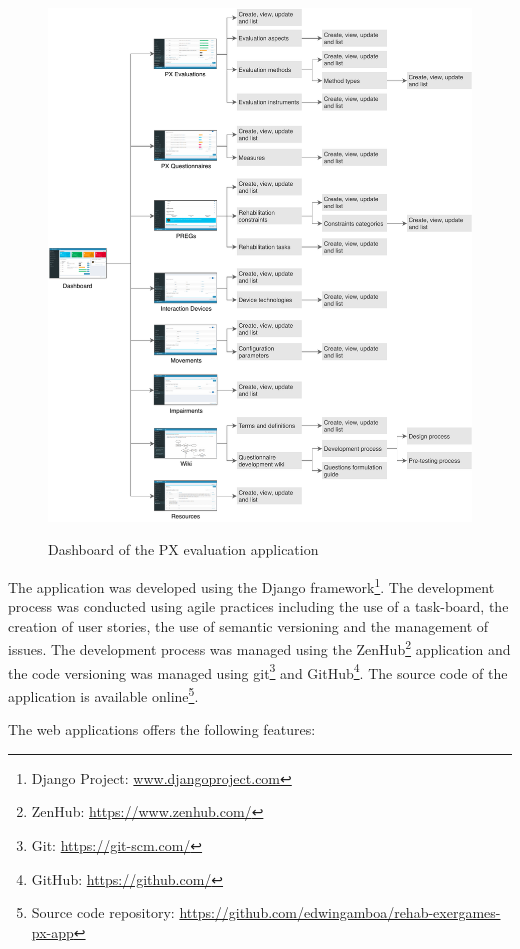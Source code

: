 \begin{figure}[bth]
\myfloatalign
{\includegraphics[width=\linewidth]{gfx/app/navigationDiagram}} \quad
\caption{Dashboard of the \ac{PX} evaluation application}\label{fig:navigationDiagram}
\end{figure}

The application was developed using the Django framework\footnote{Django Project: \url{www.djangoproject.com}}. The development process was conducted using agile practices including the use of a task-board, the creation of user stories, the use of semantic versioning and the management of issues. The development process was managed using the ZenHub\footnote{ZenHub: \url{https://www.zenhub.com/}} application and the code versioning was managed using git\footnote{Git: \url{https://git-scm.com/}} and GitHub\footnote{GitHub: \url{https://github.com/}}. The source code of the application is available online\footnote{Source code repository: \url{https://github.com/edwingamboa/rehab-exergames-px-app}}.


The web applications offers the following features:

